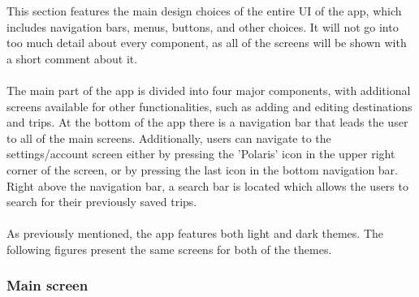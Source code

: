 \hspace{\parindent}This section features the main design choices of the entire UI of the app, which includes navigation bars, menus, buttons, and other choices. It will not go into too much detail about every component, as all of the screens will be shown with a short comment about it. \\ \\
The main part of the app is divided into four major components, with additional screens available for other functionalities, such as adding and editing destinations and trips. At the bottom of the app there is a navigation bar that leads the user to all of the main screens. Additionally, users can navigate to the settings/account screen either by pressing the 'Polaris' icon in the upper right corner of the screen, or by pressing the last icon in the bottom navigation bar. Right above the navigation bar, a search bar is located which allows the users to search for their previously saved trips.\\ \\
As previously mentioned, the app features both light and dark themes. The following figures present the same screens for both of the themes.\\


\subsubsection{Main screen}

